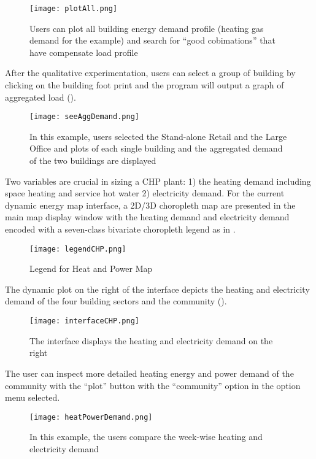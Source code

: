 \begin{enumerate}[1).]
  \begin{figure}[h!]
    \centering
    \texttt{[image: plotAll.png]}
    \caption[See All Demand Plot]{Users can plot all building energy
      demand profile (heating gas demand for the example) and search
      for ``good cobimations'' that have compensate load profile}
    \label{fig:plotAll}
  \end{figure}
  
  After the qualitative experimentation, users can select a group of
  building by clicking on the building foot print and the program will
  output a graph of aggregated load ().

  \begin{figure}[h!]
    \centering
    \texttt{[image: seeAggDemand.png]}
    \caption[Plot Aggregated Demand]{In this example, users selected
      the Stand-alone Retail and the Large Office and plots of each
      single building and the aggregated demand of the two buildings
      are displayed}
    \label{fig:seeAggDemand}
  \end{figure}
  
\end{enumerate}




Two variables are crucial in sizing a CHP plant: 1) the heating demand
including space heating and service hot water 2) electricity
demand. For the current dynamic energy map interface, a 2D/3D
choropleth map are presented in the main map display window with the
heating demand and electricity demand encoded with a seven-class
bivariate choropleth legend as in .
\begin{figure}[h!]
  \centering
  \texttt{[image: legendCHP.png]}
  \caption[Legend for Heat and Power Map]{Legend for Heat and Power
    Map}
  \label{fig:legendCHP}
\end{figure}
The dynamic plot on the right of the interface depicts the heating and
electricity demand of the four building sectors and the community
().
\begin{figure}[h!]
  \centering
  \texttt{[image: interfaceCHP.png]}
  \caption[Interface for CHP Sizing]{The interface displays the
    heating and electricity demand on the right}
  \label{fig:interfaceCHP}
\end{figure}

The user can inspect more detailed heating energy and power demand of
the community with the ``plot'' button with the ``community'' option
in the option menu selected.
\begin{figure}[h!]
  \centering
  \texttt{[image: heatPowerDemand.png]}
  \caption[Comparing Community Heating and Electricity Demand]{In this
    example, the users compare the week-wise heating and electricity
    demand}
  \label{fig:heatPowerDemand}
\end{figure}

